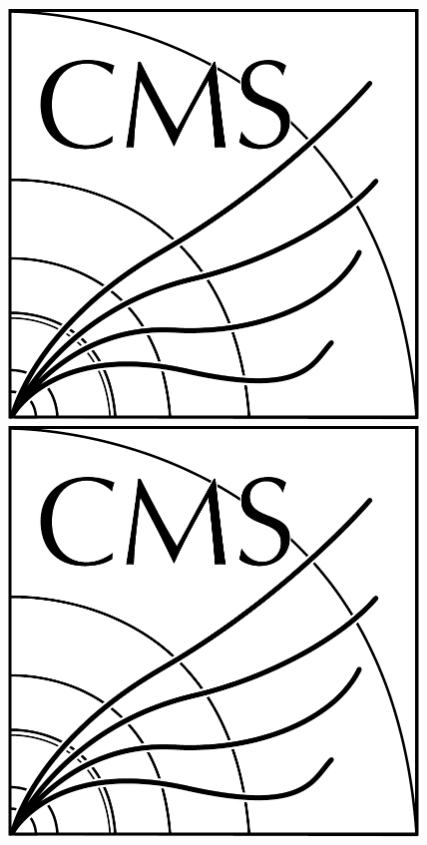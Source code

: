 \begin{figure}[htb]
\centering
\includegraphics[width=0.97\textwidth]{CMS-bw-logo.pdf}
\\
\includegraphics[width=0.97\textwidth]{CMS-bw-logo.pdf}
\\

\end{figure}
